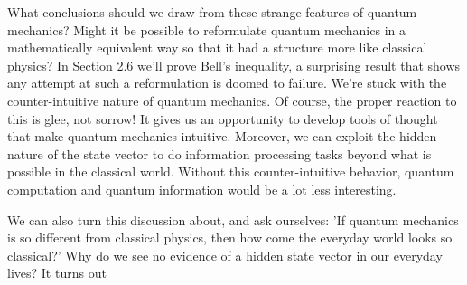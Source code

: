 \documentclass[10pt]{article}
\begin{document}
What conclusions should we draw from these strange features of quantum mechanics? Might it be possible to reformulate quantum mechanics in a mathematically equivalent way so that it had a structure more like classical physics? In Section 2.6 we'll prove Bell's inequality, a surprising result that shows any attempt at such a reformulation is doomed to failure. We're stuck with the counter-intuitive nature of quantum mechanics. Of course, the proper reaction to this is glee, not sorrow! It gives us an opportunity to develop tools of thought that make quantum mechanics intuitive. Moreover, we can exploit the hidden nature of the state vector to do information processing tasks beyond what is possible in the classical world. Without this counter-intuitive behavior, quantum computation and quantum information would be a lot less interesting.

We can also turn this discussion about, and ask ourselves: 'If quantum mechanics is so different from classical physics, then how come the everyday world looks so classical?' Why do we see no evidence of a hidden state vector in our everyday lives? It turns out
\end{document}
